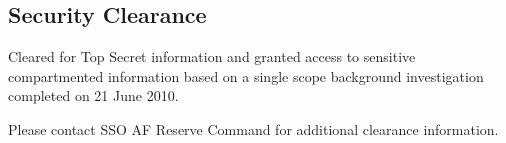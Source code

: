 \subsection*{Security Clearance}
{}
Cleared for Top Secret information and granted access to sensitive compartmented information based on a single scope background investigation completed on 21 June 2010.

Please contact SSO AF Reserve Command for additional clearance information.
